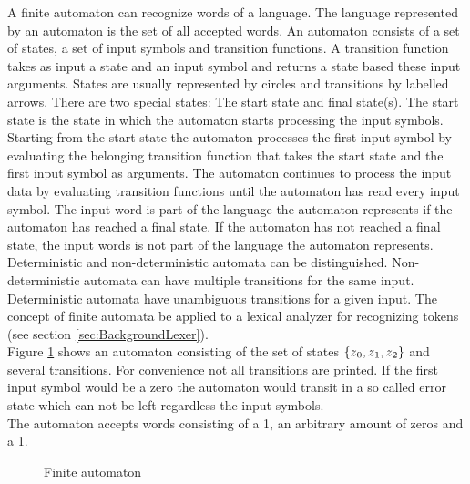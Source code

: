 A finite automaton can recognize words of a language.
The language represented by an automaton is the set of all accepted words.
An automaton consists of  a set of states, a set of input symbols and transition functions.
A transition function takes as input a state and an input symbol and returns a state based these input arguments.
States are usually represented by circles and transitions by labelled arrows.
There are two special states: The start state and final state(s).
The start state is the state in which the automaton starts processing the input symbols.
Starting from the start state the automaton processes the first input symbol by evaluating the belonging transition function that takes the start state and the first input symbol as arguments. The automaton continues to process the input data by evaluating transition functions until the automaton has read every input symbol. The input word is part of the language the automaton represents if the automaton has reached a final state. If the automaton has not reached a final state, the input words is not part of the language the automaton represents.\\
Deterministic and non-deterministic automata can be distinguished.
Non-deterministic automata can have multiple transitions for the same input.
Deterministic automata have unambiguous transitions for a given input.
The concept of finite automata be applied to a lexical analyzer for recognizing tokens (see section \ref{sec:BackgroundLexer}). \cite{AutomataTheory.2007}\\
Figure \ref{fig:FiniteAutomaton} shows an automaton consisting of the set of states $\{z\textsubscript{0}, z\textsubscript{1}, z\textsubscript{2}\}$ and several transitions. For convenience not all transitions are printed.
If the first input symbol would be a zero the automaton would transit in a so called error state which can not be left regardless the input symbols.\\
The automaton accepts words consisting of a 1, an arbitrary amount of zeros and a 1.

\begin{figure}[H]
\centering
{}
\caption{Finite automaton}
\label{fig:FiniteAutomaton}
\end{figure}


